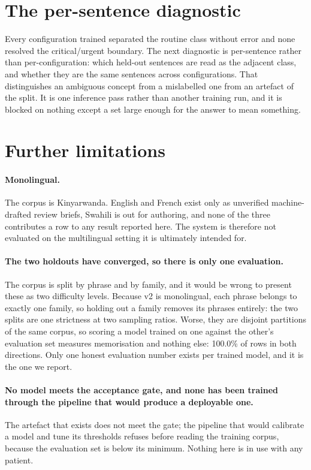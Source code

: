 \section{The per-sentence diagnostic}
\label{app:diagnostic}

Every configuration trained separated the routine class without error and none
resolved the critical/urgent boundary. The next diagnostic is per-sentence rather
than per-configuration: which held-out sentences are read as the adjacent class,
and whether they are the same sentences across configurations. That distinguishes
an ambiguous concept from a mislabelled one from an artefact of the split. It is
one inference pass rather than another training run, and it is blocked on nothing
except a set large enough for the answer to mean something.

\section{Further limitations}
\label{app:limits}

\paragraph{Monolingual.} The corpus is Kinyarwanda. English and French exist
only as unverified machine-drafted review briefs, Swahili is out for authoring,
and none of the three contributes a row to any result reported here. The system
is therefore not evaluated on the multilingual setting it is ultimately
intended for.

\paragraph{The two holdouts have converged, so there is only one evaluation.}
The corpus is split by phrase and by family, and it would be wrong to present
these as two difficulty levels. Because v2 is monolingual, each phrase belongs
to exactly one family, so holding out a family removes its phrases entirely: the
two splits are one strictness at two sampling ratios. Worse, they are disjoint
partitions of the same corpus, so scoring a model trained on one against the
other's evaluation set measures memorisation and nothing else: 100.0\% of
rows in both directions. Only one honest evaluation number exists per trained
model, and it is the one we report.

\paragraph{No model meets the acceptance gate, and none has been trained
through the pipeline that would produce a deployable one.} The artefact that
exists does not meet the gate; the pipeline that would calibrate a model and tune
its thresholds refuses before reading the training corpus, because the
evaluation set is below its minimum. Nothing here is in use with any patient.


